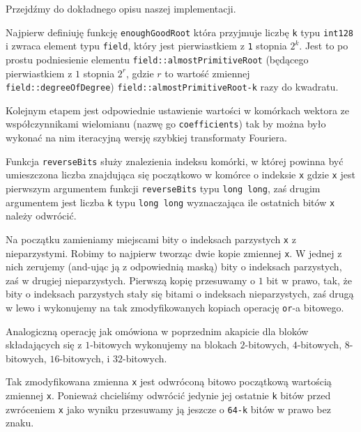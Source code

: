 \documentclass{article}
\begin{document}
Przejdźmy do dokładnego opisu naszej implementacji. 

Najpierw definiuję funkcję \texttt{enoughGoodRoot} która przyjmuje liczbę \texttt{k} typu 
\texttt{\textunderscore \textunderscore int128}
 i zwraca element typu \texttt{field}, który jest pierwiastkiem z \texttt{1} stopnia $2^k$. 
Jest to po prostu podniesienie elementu \texttt{field::almostPrimitiveRoot} (będącego pierwiastkiem z $1$ stopnia $2^{r}$, gdzie $r$
to wartość zmiennej \texttt{field::degreeOfDegree}) \texttt{field::almostPrimitiveRoot-k}
razy do kwadratu.





Kolejnym etapem jest odpowiednie ustawienie wartości w komórkach wektora ze współczynnikami wielomianu 
(nazwę go \texttt{coefficients}) tak by można było wykonać na nim iteracyjną wersję szybkiej transformaty Fouriera. 



Funkcja \texttt{reverseBits} służy znalezienia indeksu komórki, w której powinna być umieszczona 
liczba znajdująca się początkowo w komórce o indeksie \texttt{x} gdzie \texttt{x} jest pierwszym 
argumentem funkcji \texttt{reverseBits} typu
\texttt{long long}, zaś drugim argumentem jest liczba \texttt{k} 
typu \texttt{long long} wyznaczająca ile ostatnich bitów \texttt{x} należy odwrócić.

Na początku zamieniamy miejscami bity o indeksach parzystych \texttt{x} z nieparzystymi.
Robimy to najpierw tworząc dwie kopie zmiennej \texttt{x}. W jednej z nich zerujemy 
(and-ując ją z odpowiednią maską) bity o indeksach parzystych, zaś w drugiej nieparzystych.
Pierwszą kopię przesuwamy o $1$ bit w prawo, tak, że bity o indeksach parzystych stały się bitami
o indeksach nieparzystych, zaś drugą w lewo i wykonujemy na tak zmodyfikowanych kopiach operację
\texttt{or}-a bitowego. 

Analogiczną operację jak omówiona w poprzednim akapicie dla bloków składających się z $1$-bitowych 
wykonujemy na blokach $2$-bitowych, $4$-bitowych, $8$-bitowych, $16$-bitowych,
i $32$-bitowych. 

Tak zmodyfikowana zmienna \texttt{x} jest odwróconą bitowo początkową wartością zmiennej 
\texttt{x}. Ponieważ chcieliśmy odwrócić jedynie jej ostatnie \texttt{k} bitów przed 
zwróceniem \texttt{x} jako wyniku przesuwamy ją jeszcze o \texttt{64-k} bitów w prawo bez znaku.
\end{document}
